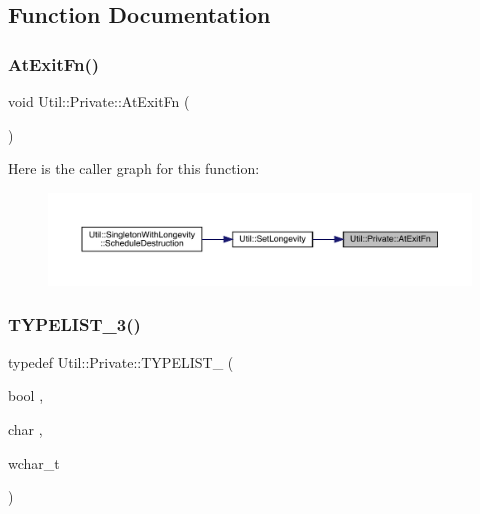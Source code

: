 \subsection{Function Documentation}
\mbox{\label{namespaceUtil_1_1Private_a98e2ffcf46d002cf16c15c8ab26e7818}} 
\subsubsection{\texorpdfstring{AtExitFn()}{AtExitFn()}}
{\footnotesize\ttfamily void Util\+::\+Private\+::\+At\+Exit\+Fn (\begin{DoxyParamCaption}{ }\end{DoxyParamCaption})}

Here is the caller graph for this function\+:\nopagebreak
\begin{figure}[H]
\begin{center}
\leavevmode
\includegraphics[width=350pt]{d9/d09/namespaceUtil_1_1Private_a98e2ffcf46d002cf16c15c8ab26e7818_icgraph}
\end{center}
\end{figure}
\mbox{\label{namespaceUtil_1_1Private_a3b8821ccc8b156ae11dc2d5852d47af0}} 
\subsubsection{\texorpdfstring{TYPELIST\_3()}{TYPELIST\_3()}\hspace{0.1cm}{\footnotesize\ttfamily [1/2]}}
{\footnotesize\ttfamily typedef Util\+::\+Private\+::\+T\+Y\+P\+E\+L\+I\+S\+T\+\_ (\begin{DoxyParamCaption}\item[{bool}]{,  }\item[{char}]{,  }\item[{wchar\+\_\+t}]{ }\end{DoxyParamCaption})}

